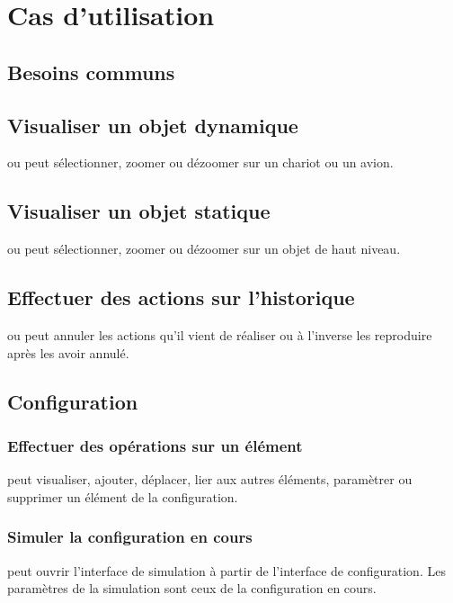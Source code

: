 \section{Cas d'utilisation}

\subsection{Besoins communs}
\subsection{Visualiser un objet dynamique}
 ou  peut sélectionner, zoomer ou dézoomer sur un chariot ou un avion.

\subsection{Visualiser un objet statique}
 ou  peut sélectionner, zoomer ou dézoomer sur un objet de haut niveau.

\subsection{Effectuer des actions sur l'historique}
 ou  peut annuler les actions qu'il vient de réaliser ou à l'inverse les reproduire après les avoir annulé.

\subsection{Configuration}
\subsubsection{Effectuer des opérations sur un élément}
 peut visualiser, ajouter, déplacer, lier aux autres éléments, paramètrer ou supprimer un élément de la configuration.

\subsubsection{Simuler la configuration en cours}
 peut ouvrir l'interface de simulation à partir de l'interface de configuration. Les paramètres de la simulation sont ceux de la configuration en cours.


